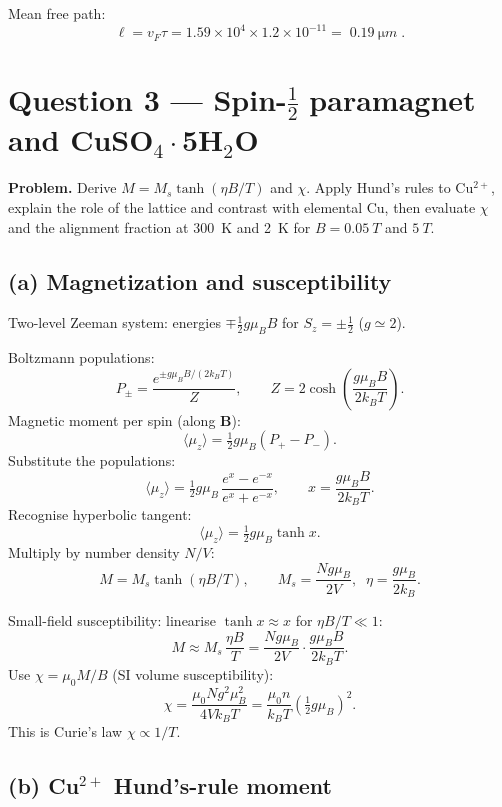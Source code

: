 \documentclass[11pt]{article}
\begin{document}
Mean free path:
\[
\ell = v_F\tau = 1.59\times 10^4\times 1.2\times 10^{-11} = \boxed{\;\SI{0.19}{\micro m}\;}.
\]

\section*{Question 3 --- Spin-$\tfrac12$ paramagnet and CuSO$_4\cdot$5H$_2$O}

\textbf{Problem.} Derive $M = M_s\tanh(\eta B/T)$ and $\chi$. Apply Hund's rules to Cu$^{2+}$, explain the role of the lattice and contrast with elemental Cu, then evaluate $\chi$ and the alignment fraction at \SI{300}{K} and \SI{2}{K} for $B=\SI{0.05}{T}$ and $\SI{5}{T}$.

\subsection*{(a) Magnetization and susceptibility}

Two-level Zeeman system: energies $\mp\tfrac12 g\mu_B B$ for $S_z = \pm\tfrac12$ ($g\simeq 2$).

Boltzmann populations:
\[
P_\pm = \frac{e^{\pm g\mu_B B/(2 k_B T)}}{Z},\qquad Z = 2\cosh\!\left(\frac{g\mu_B B}{2 k_B T}\right).
\]
Magnetic moment per spin (along $\bm B$):
\[
\langle\mu_z\rangle = \tfrac12 g\mu_B(P_+-P_-).
\]
Substitute the populations:
\[
\langle\mu_z\rangle = \tfrac12 g\mu_B\,\frac{e^{x}-e^{-x}}{e^{x}+e^{-x}},\qquad x = \frac{g\mu_B B}{2 k_B T}.
\]
Recognise hyperbolic tangent:
\[
\langle\mu_z\rangle = \tfrac12 g\mu_B\tanh x.
\]
Multiply by number density $N/V$:
\begin{equation}
\boxed{\;M = M_s\tanh(\eta B/T),\qquad M_s = \frac{N g\mu_B}{2V},\;\; \eta = \frac{g\mu_B}{2 k_B}.\;}
\label{eq:M-tanh}
\end{equation}

Small-field susceptibility: linearise $\tanh x\approx x$ for $\eta B/T\ll 1$:
\[
M \approx M_s\,\frac{\eta B}{T} = \frac{N g\mu_B}{2V}\cdot\frac{g\mu_B B}{2 k_B T}.
\]
Use $\chi = \mu_0 M/B$ (SI volume susceptibility):
\begin{equation}
\boxed{\;\chi = \frac{\mu_0 N g^2 \mu_B^2}{4 V k_B T} = \frac{\mu_0 n}{k_B T}(\tfrac12 g\mu_B)^2.\;}
\label{eq:chi}
\end{equation}
This is Curie's law $\chi\propto 1/T$.

\subsection*{(b) Cu$^{2+}$ Hund's-rule moment}
\end{document}
